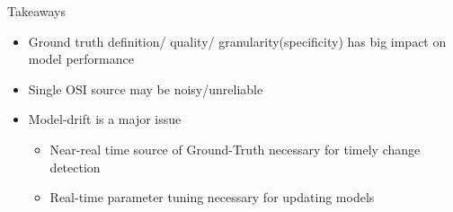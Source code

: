 \begin{frame}{Takeaways}
\begin{itemize}
    \item Ground truth definition/ quality/ granularity(specificity) has big impact on model performance
    \item Single OSI source may be noisy/unreliable
    \item Model-drift is a major issue
        \begin{itemize}
            \item Near-real time source of Ground-Truth necessary for timely change detection
            \item Real-time parameter tuning necessary for updating models
        \end{itemize}
\end{itemize}
    
\end{frame}